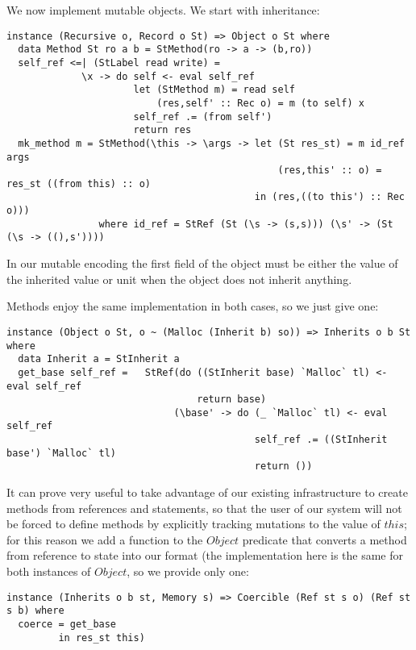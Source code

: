 We now implement mutable objects. We start with inheritance:
\begin{lstlisting}
instance (Recursive o, Record o St) => Object o St where
  data Method St ro a b = StMethod(ro -> a -> (b,ro))
  self_ref <=| (StLabel read write) = 
             \x -> do self <- eval self_ref
                      let (StMethod m) = read self
                          (res,self' :: Rec o) = m (to self) x
                      self_ref .= (from self')
                      return res
  mk_method m = StMethod(\this -> \args -> let (St res_st) = m id_ref args
                                               (res,this' :: o) = res_st ((from this) :: o)
                                           in (res,((to this') :: Rec o)))
                where id_ref = StRef (St (\s -> (s,s))) (\s' -> (St (\s -> ((),s'))))
\end{lstlisting}
In our mutable encoding the first field of the object must be either the value of the inherited value or unit when the object does not inherit anything.

Methods enjoy the same implementation in both cases, so we just give one:
\begin{lstlisting}
instance (Object o St, o ~ (Malloc (Inherit b) so)) => Inherits o b St where
  data Inherit a = StInherit a
  get_base self_ref =   StRef(do ((StInherit base) `Malloc` tl) <- eval self_ref
                                 return base)
                             (\base' -> do (_ `Malloc` tl) <- eval self_ref
                                           self_ref .= ((StInherit base') `Malloc` tl)
                                           return ())
\end{lstlisting}

It can prove very useful to take advantage of our existing infrastructure to create methods from references and statements, so that the user of our system will not be forced to define methods by explicitly tracking mutations to the value of $this$; for this reason we add a function to the $Object$ predicate that converts a method from reference to state into our format (the implementation here is the same for both instances of $Object$, so we provide only one:
\begin{lstlisting}
instance (Inherits o b st, Memory s) => Coercible (Ref st s o) (Ref st s b) where
  coerce = get_base
         in res_st this)
\end{lstlisting}